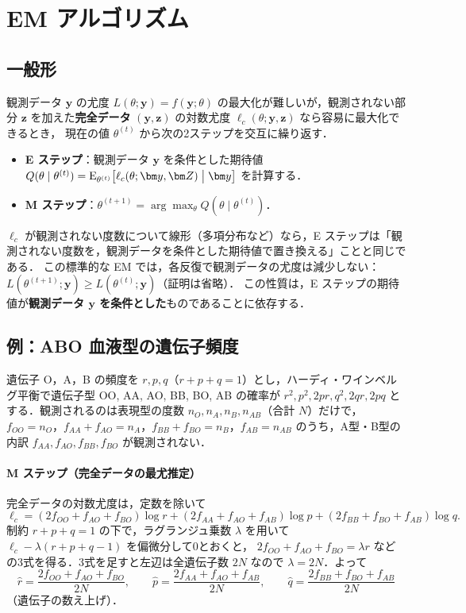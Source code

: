 \documentclass[a4paper,11pt,openany]{ltjsbook}
\newcommand{\tagbox}[2]{\tcbox[on line,boxsep=0.5pt,left=2pt,right=2pt,top=0.5pt,bottom=0.5pt,
  colframe=#1,colback=#1!10,boxrule=0.4pt,arc=1pt]{\scriptsize\bfseries\textcolor{#1}{#2}}}
\newcommand{\Hissu}{\tagbox{bkred}{必須}}
\newcommand{\E}{\mathrm{E}}
\begin{document}
\section{EM アルゴリズム}\label{sec:16-em}
\Hissu
\subsection{一般形}
観測データ $\bm y$ の尤度 $L(\theta;\bm y)=f(\bm y;\theta)$ の最大化が難しいが，観測されない部分 $\bm z$ を加えた\textbf{完全データ} $(\bm y,\bm z)$ の対数尤度 $\ell_c(\theta;\bm y,\bm z)$ なら容易に最大化できるとき，
現在の値 $\theta^{(t)}$ から次の2ステップを交互に繰り返す．
\begin{itemize}
\item \textbf{E ステップ}：観測データ $\bm y$ を条件とした期待値 $Q(\theta\mid\theta^{(t)})=\E_{\theta^{(t)}}\bigl[\ell_c(\theta;\bm y,\bm Z)\bigm|\bm y\bigr]$ を計算する．
\item \textbf{M ステップ}：$\theta^{(t+1)}=\arg\max_\theta Q(\theta\mid\theta^{(t)})$．
\end{itemize}
$\ell_c$ が観測されない度数について線形（多項分布など）なら，E ステップは「観測されない度数を，観測データを条件とした期待値で置き換える」ことと同じである．
この標準的な EM では，各反復で観測データの尤度は減少しない：$L(\theta^{(t+1)};\bm y)\ge L(\theta^{(t)};\bm y)$（証明は省略）．
この性質は，E ステップの期待値が\textbf{観測データ $\bm y$ を条件とした}ものであることに依存する．

\subsection{例：ABO 血液型の遺伝子頻度}
遺伝子 O，A，B の頻度を $r,p,q$（$r+p+q=1$）とし，ハーディ・ワインベルグ平衡で遺伝子型 OO, AA, AO, BB, BO, AB の確率が
$r^2,p^2,2pr,q^2,2qr,2pq$ とする．観測されるのは表現型の度数 $n_O,n_A,n_B,n_{AB}$（合計 $N$）だけで，
$f_{OO}=n_O$，$f_{AA}+f_{AO}=n_A$，$f_{BB}+f_{BO}=n_B$，$f_{AB}=n_{AB}$ のうち，A型・B型の内訳 $f_{AA},f_{AO},f_{BB},f_{BO}$ が観測されない．

\paragraph{M ステップ（完全データの最尤推定）}
完全データの対数尤度は，定数を除いて
\[
\ell_c=(2f_{OO}+f_{AO}+f_{BO})\log r+(2f_{AA}+f_{AO}+f_{AB})\log p+(2f_{BB}+f_{BO}+f_{AB})\log q .
\]
制約 $r+p+q=1$ の下で，ラグランジュ乗数 $\lambda$ を用いて $\ell_c-\lambda(r+p+q-1)$ を偏微分して0とおくと，
$2f_{OO}+f_{AO}+f_{BO}=\lambda r$ などの3式を得る．3式を足すと左辺は全遺伝子数 $2N$ なので $\lambda=2N$．よって
\begin{equation}
\hat r=\frac{2f_{OO}+f_{AO}+f_{BO}}{2N},\qquad
\hat p=\frac{2f_{AA}+f_{AO}+f_{AB}}{2N},\qquad
\hat q=\frac{2f_{BB}+f_{BO}+f_{AB}}{2N}\label{eq:16-mstep}
\end{equation}
（遺伝子の数え上げ）．
\end{document}
